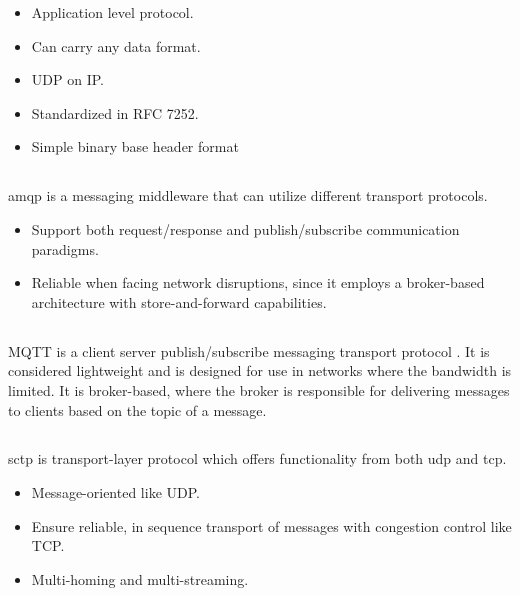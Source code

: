 \begin{itemize}
    \item Application level protocol.
    \item Can carry any data format.
    \item UDP on IP.
    \item Standardized in RFC 7252.
    \item Simple binary base header format
\end{itemize}


\subsection{}

\gls{amqp} is a messaging middleware that can utilize different transport
protocols.

\begin{itemize}
    \item Support both request/response and publish/subscribe communication
    paradigms.
    \item Reliable when facing network disruptions, since it employs a
    broker-based architecture with store-and-forward capabilities.
\end{itemize}

\subsection{}

MQTT is a client server publish/subscribe messaging transport protocol
\cite{oasis-mqtt}. It is considered lightweight and is designed for use in networks
where the bandwidth is limited. It is broker-based, where the broker is
responsible for delivering messages to clients based on the topic of a
message.

\subsection{}

\gls{sctp} is transport-layer protocol which offers functionality from both \gls{udp} and \gls{tcp}.
\begin{itemize}
    \item Message-oriented like UDP.
    \item Ensure reliable, in sequence transport of messages with congestion control like TCP.
    \item Multi-homing and multi-streaming.
\end{itemize}


